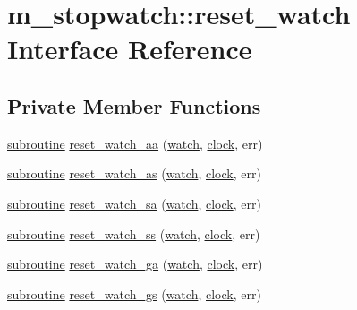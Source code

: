 \hypertarget{interfacem__stopwatch_1_1reset__watch}{}\section{m\+\_\+stopwatch\+:\+:reset\+\_\+watch Interface Reference}
\label{interfacem__stopwatch_1_1reset__watch}
\subsection*{Private Member Functions}
\begin{DoxyCompactItemize}
\item 
\hyperlink{M__stopwatch_83_8txt_acfbcff50169d691ff02d4a123ed70482}{subroutine} \hyperlink{interfacem__stopwatch_1_1reset__watch_a46c154eaa914897d9bc309350d28a5d7}{reset\+\_\+watch\+\_\+aa} (\hyperlink{read__watch_83_8txt_ad2129669fa47b8899641309620add095}{watch}, \hyperlink{stop__watch_83_8txt_a148c035b430d6edf5413dbd2704facfb}{clock}, err)
\item 
\hyperlink{M__stopwatch_83_8txt_acfbcff50169d691ff02d4a123ed70482}{subroutine} \hyperlink{interfacem__stopwatch_1_1reset__watch_ab44c6e38fa26c7aad501303ba7d02200}{reset\+\_\+watch\+\_\+as} (\hyperlink{read__watch_83_8txt_ad2129669fa47b8899641309620add095}{watch}, \hyperlink{stop__watch_83_8txt_a148c035b430d6edf5413dbd2704facfb}{clock}, err)
\item 
\hyperlink{M__stopwatch_83_8txt_acfbcff50169d691ff02d4a123ed70482}{subroutine} \hyperlink{interfacem__stopwatch_1_1reset__watch_ab245aa35eedf147ca647f2440d3f98e8}{reset\+\_\+watch\+\_\+sa} (\hyperlink{read__watch_83_8txt_ad2129669fa47b8899641309620add095}{watch}, \hyperlink{stop__watch_83_8txt_a148c035b430d6edf5413dbd2704facfb}{clock}, err)
\item 
\hyperlink{M__stopwatch_83_8txt_acfbcff50169d691ff02d4a123ed70482}{subroutine} \hyperlink{interfacem__stopwatch_1_1reset__watch_ad5423f320af136dc18db5bbcf410ede1}{reset\+\_\+watch\+\_\+ss} (\hyperlink{read__watch_83_8txt_ad2129669fa47b8899641309620add095}{watch}, \hyperlink{stop__watch_83_8txt_a148c035b430d6edf5413dbd2704facfb}{clock}, err)
\item 
\hyperlink{M__stopwatch_83_8txt_acfbcff50169d691ff02d4a123ed70482}{subroutine} \hyperlink{interfacem__stopwatch_1_1reset__watch_a4fd01f66023a3d9183ea5171585d3df9}{reset\+\_\+watch\+\_\+ga} (\hyperlink{read__watch_83_8txt_ad2129669fa47b8899641309620add095}{watch}, \hyperlink{stop__watch_83_8txt_a148c035b430d6edf5413dbd2704facfb}{clock}, err)
\item 
\hyperlink{M__stopwatch_83_8txt_acfbcff50169d691ff02d4a123ed70482}{subroutine} \hyperlink{interfacem__stopwatch_1_1reset__watch_afc60d10b14a23a5ddbeded0dbbfbeb3c}{reset\+\_\+watch\+\_\+gs} (\hyperlink{read__watch_83_8txt_ad2129669fa47b8899641309620add095}{watch}, \hyperlink{stop__watch_83_8txt_a148c035b430d6edf5413dbd2704facfb}{clock}, err)
\end{DoxyCompactItemize}


